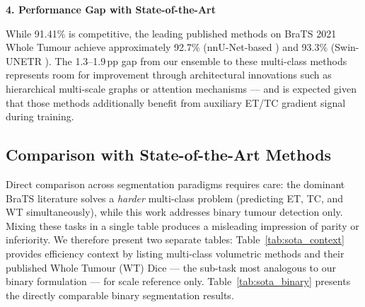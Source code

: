 \documentclass{article}
\begin{document}
\textbf{4. Performance Gap with State-of-the-Art}

While 91.41\% is competitive, the leading published methods on BraTS 2021 Whole Tumour achieve approximately 92.7\% (nnU-Net-based \cite{isensee2021nnunet}) and 93.3\% (Swin-UNETR \cite{hatamizadeh2022swin}). The 1.3--1.9\,pp gap from our ensemble to these multi-class methods represents room for improvement through architectural innovations such as hierarchical multi-scale graphs or attention mechanisms — and is expected given that those methods additionally benefit from auxiliary ET/TC gradient signal during training.


\subsection{Comparison with State-of-the-Art Methods}

Direct comparison across segmentation paradigms requires care: the dominant BraTS literature solves a \textit{harder} multi-class problem (predicting ET, TC, and WT simultaneously), while this work addresses binary tumour detection only. Mixing these tasks in a single table produces a misleading impression of parity or inferiority. We therefore present two separate tables: Table~\ref{tab:sota_context} provides efficiency context by listing multi-class volumetric methods and their published Whole Tumour (WT) Dice — the sub-task most analogous to our binary formulation — for scale reference only. Table~\ref{tab:sota_binary} presents the directly comparable binary segmentation results.
\end{document}
